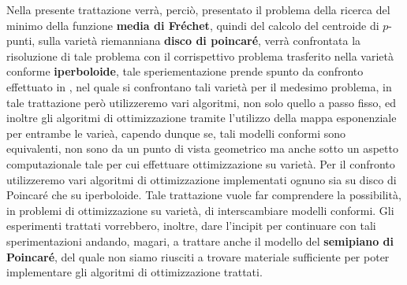 \documentclass[a4paper, 12pt]{article}
\begin{document}
Nella presente trattazione verrà, perciò, presentato il problema della ricerca del minimo della funzione \textbf{media di Fréchet}, quindi del calcolo del centroide di $p$-punti, sulla varietà riemanniana \textbf{disco di poincaré}, verrà confrontata la risoluzione di tale problema con il corrispettivo problema trasferito nella varietà conforme \textbf{iperboloide}, tale speriementazione prende spunto da confronto effettuato in \cite{Gradient Descent in Hyperbolic Space}, nel quale si confrontano tali varietà per il medesimo problema, in tale trattazione però utilizzeremo vari algoritmi, non solo quello a passo fisso, ed inoltre gli algoritmi di ottimizzazione tramite l'utilizzo della mappa esponenziale per entrambe le varieà, capendo dunque se, tali modelli conformi sono equivalenti, non sono da un punto di vista geometrico ma anche sotto un aspetto computazionale tale per cui effettuare ottimizzazione su varietà. Per il confronto utilizzeremo vari algoritmi di ottimizzazione implementati ognuno sia su disco di Poincaré che su iperboloide. Tale trattazione vuole far comprendere la possibilità, in problemi di ottimizzazione su varietà, di interscambiare modelli conformi. Gli esperimenti trattati vorrebbero, inoltre, dare l'incipit per continuare con tali sperimentazioni andando, magari, a trattare anche il modello del \textbf{semipiano di Poincaré}, del quale non siamo riusciti a trovare materiale sufficiente per poter implementare gli algoritmi di ottimizzazione trattati.
\end{document}
